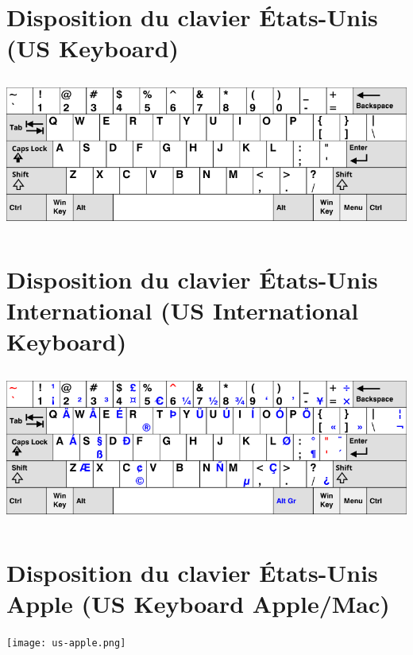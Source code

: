 \documentclass[10pt,a4paper]{article}
\begin{document}
\cheatsheet

\section{Disposition du clavier États-Unis (US Keyboard)}
\begin{center}
  \includegraphics[height=5cm]{us.png}
\end{center}

\section{Disposition du clavier États-Unis International (US International Keyboard)}
\begin{center}
  \includegraphics[height=5cm]{us-international.png}
\end{center}

\newpage
\cheatsheet

\section{Disposition du clavier États-Unis Apple (US Keyboard Apple/Mac)}
\begin{center}
  \texttt{[image: us-apple.png]}
\end{center}
\end{document}
